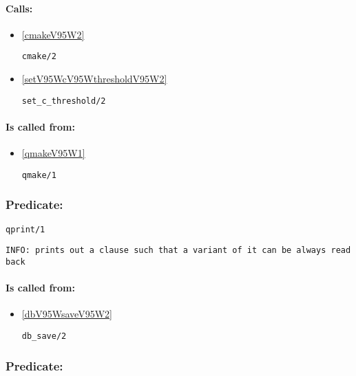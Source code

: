 \paragraph{Calls:} 
\begin{itemize}
\item \ref{cmakeV95W2} 
\begin{verbatim}
cmake/2
\end{verbatim}

\item \ref{setV95WcV95WthresholdV95W2} 
\begin{verbatim}
set_c_threshold/2
\end{verbatim}

\end{itemize}
\paragraph{Is called from:} 
\begin{itemize}
\item \ref{qmakeV95W1} 
\begin{verbatim}
qmake/1
\end{verbatim}

\end{itemize}

\subsubsection{Predicate:} \label{qprintV95W1}

\begin{verbatim}
qprint/1
\end{verbatim}

{\small \begin{verbatim}
INFO: prints out a clause such that a variant of it can be always read back

\end{verbatim}}
\paragraph{Is called from:} 
\begin{itemize}
\item \ref{dbV95WsaveV95W2} 
\begin{verbatim}
db_save/2
\end{verbatim}

\end{itemize}

\subsubsection{Predicate:} \label{quietV95W1}

